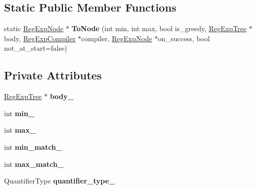 \subsection*{Static Public Member Functions}
\begin{DoxyCompactItemize}
\item 
static \hyperlink{classv8_1_1internal_1_1_reg_exp_node}{Reg\+Exp\+Node} $\ast$ {\bfseries To\+Node} (int min, int max, bool is\+\_\+greedy, \hyperlink{classv8_1_1internal_1_1_reg_exp_tree}{Reg\+Exp\+Tree} $\ast$body, \hyperlink{classv8_1_1internal_1_1_reg_exp_compiler}{Reg\+Exp\+Compiler} $\ast$compiler, \hyperlink{classv8_1_1internal_1_1_reg_exp_node}{Reg\+Exp\+Node} $\ast$on\+\_\+success, bool not\+\_\+at\+\_\+start=false)\hypertarget{classv8_1_1internal_1_1_reg_exp_quantifier_af74888630424746f820660fbfc63e0fe}{}\label{classv8_1_1internal_1_1_reg_exp_quantifier_af74888630424746f820660fbfc63e0fe}

\end{DoxyCompactItemize}
\subsection*{Private Attributes}
\begin{DoxyCompactItemize}
\item 
\hyperlink{classv8_1_1internal_1_1_reg_exp_tree}{Reg\+Exp\+Tree} $\ast$ {\bfseries body\+\_\+}\hypertarget{classv8_1_1internal_1_1_reg_exp_quantifier_a4d7fb9f57da93e4accd74ccc7c467078}{}\label{classv8_1_1internal_1_1_reg_exp_quantifier_a4d7fb9f57da93e4accd74ccc7c467078}

\item 
int {\bfseries min\+\_\+}\hypertarget{classv8_1_1internal_1_1_reg_exp_quantifier_aa692634882a0b3ecb1e153ab33a20d5a}{}\label{classv8_1_1internal_1_1_reg_exp_quantifier_aa692634882a0b3ecb1e153ab33a20d5a}

\item 
int {\bfseries max\+\_\+}\hypertarget{classv8_1_1internal_1_1_reg_exp_quantifier_a8eef1355fa1fc40060339de49a51f27d}{}\label{classv8_1_1internal_1_1_reg_exp_quantifier_a8eef1355fa1fc40060339de49a51f27d}

\item 
int {\bfseries min\+\_\+match\+\_\+}\hypertarget{classv8_1_1internal_1_1_reg_exp_quantifier_a994f034771e46bdb069be97d3d61cb66}{}\label{classv8_1_1internal_1_1_reg_exp_quantifier_a994f034771e46bdb069be97d3d61cb66}

\item 
int {\bfseries max\+\_\+match\+\_\+}\hypertarget{classv8_1_1internal_1_1_reg_exp_quantifier_a1da485f37f92d0af2b9b5baa70d21098}{}\label{classv8_1_1internal_1_1_reg_exp_quantifier_a1da485f37f92d0af2b9b5baa70d21098}

\item 
Quantifier\+Type {\bfseries quantifier\+\_\+type\+\_\+}\hypertarget{classv8_1_1internal_1_1_reg_exp_quantifier_a214b23a6a67e6de249c39020277e5884}{}\label{classv8_1_1internal_1_1_reg_exp_quantifier_a214b23a6a67e6de249c39020277e5884}

\end{DoxyCompactItemize}
